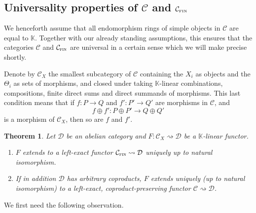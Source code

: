 \documentclass[11pt]{article}
\theoremstyle{plain}
\newtheorem{theorem}[lemma]{Theorem}
\theoremstyle{nonumberplain}
\theoremstyle{plain}
\theoremstyle{nonumberplain}
\newcommand\bK{{\mathbb K}}
\newcommand\cC{{\mathcal C}}
\newcommand\cD{{\mathcal D}}
\DeclareMathOperator{\fin}{\cat{fin}}
\newcommand{\cat}[1]{\textsc{#1}}
\begin{document}







\subsection{Universality properties of $\cC$ and $\cC_{\text{\tiny{FIN}}}$}
\label{subse.univ}


We henceforth assume that all endomorphism rings of simple objects in $\cC$ are equal to $\bK$. Together with our already standing assumptions, this ensures that the categories $\cC$ and $\cC_{\fin}$ are universal in a certain sense which we will make precise shortly. 

Denote by $\cC_X$ the smallest subcategory of $\cC$ containing the $X_i$ as objects and the $\Theta_i$ as sets of morphisms, and closed under taking $\bK$-linear combinations, compositions, finite direct sums and direct summands of morphisms. This last condition means that if $f:P\to Q$ and $f':P'\to Q'$ are morphisms in $\cC$, and
\begin{equation*}
  f\oplus f' : P\oplus P'\to Q\oplus Q'
\end{equation*}
is a morphism of $\cC_X$, then so are $f$ and $f'$. 



\begin{theorem}\label{th.univ}
Let $\cD$ be an abelian category and $F:\cC_X\rightsquigarrow \cD$ be a $\bK$-linear functor. 
\begin{enumerate}
\renewcommand{\labelenumi}{(\alph{enumi})}
\item $F$ extends to a left-exact functor $\cC_{\fin}\rightsquigarrow \cD$ uniquely up to natural isomorphism.  
\item If in addition $\cD$ has arbitrary coproducts, $F$ extends uniquely (up to natural isomorphism) to a left-exact, coproduct-preserving functor $\cC\rightsquigarrow \cD$. 
\end{enumerate}
\end{theorem}



We first need the following observation. 
\end{document}
